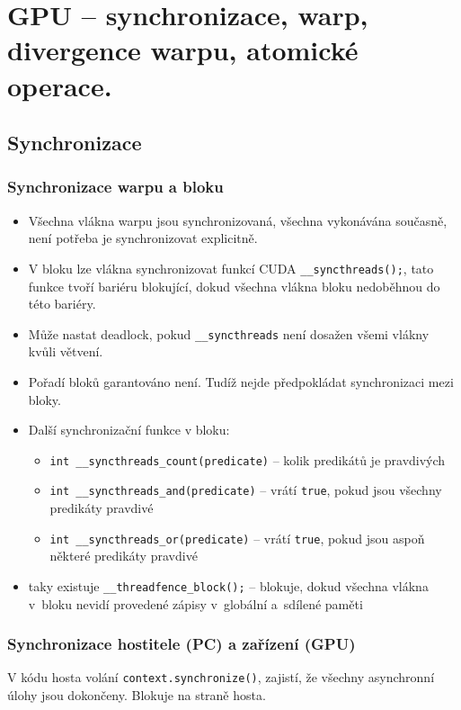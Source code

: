 \section{GPU – synchronizace, warp, divergence warpu, atomické operace.}
\subsection{Synchronizace}
\subsubsection{Synchronizace warpu a bloku}
\begin{itemize}
    \item Všechna vlákna warpu jsou synchronizovaná, všechna vykonávána současně, není potřeba je synchronizovat explicitně.
    \item V bloku lze vlákna synchronizovat funkcí CUDA \texttt{\_\_syncthreads();}, tato funkce tvoří bariéru blokující, dokud všechna vlákna bloku nedoběhnou do této bariéry.
    \item Může nastat deadlock, pokud \texttt{\_\_syncthreads} není dosažen všemi vlákny kvůli větvení.
    \item Pořadí bloků garantováno není. Tudíž nejde předpokládat synchronizaci mezi bloky.
    \item Další synchronizační funkce v bloku:
    \begin{itemize}
        \item \texttt{int \_\_syncthreads\_count(predicate)} -- kolik predikátů je pravdivých
        \item \texttt{int \_\_syncthreads\_and(predicate)} -- vrátí \texttt{true}, pokud jsou všechny predikáty pravdivé
        \item \texttt{int \_\_syncthreads\_or(predicate)} -- vrátí \texttt{true}, pokud jsou aspoň některé predikáty pravdivé
    \end{itemize}
    \item taky existuje \texttt{\_\_threadfence\_block();} -- blokuje, dokud všechna vlákna v~bloku nevidí provedené zápisy v~globální a~sdílené paměti
\end{itemize}

\subsubsection{Synchronizace hostitele (PC) a zařízení (GPU)}
V kódu hosta volání \texttt{context.synchronize()}, zajistí, že všechny asynchronní úlohy jsou dokončeny. Blokuje na straně hosta.

